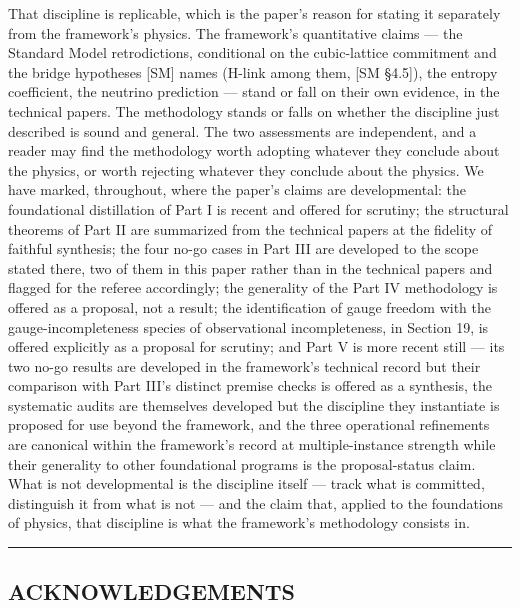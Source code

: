 \documentclass[
]{article}
\begin{document}
That discipline is replicable, which is the paper's reason for stating
it separately from the framework's physics. The framework's quantitative
claims --- the Standard Model retrodictions, conditional on the
cubic-lattice commitment and the bridge hypotheses {[}SM{]} names
(H-link among them, {[}SM §4.5{]}), the entropy coefficient, the
neutrino prediction --- stand or fall on their own evidence, in the
technical papers. The methodology stands or falls on whether the
discipline just described is sound and general. The two assessments are
independent, and a reader may find the methodology worth adopting
whatever they conclude about the physics, or worth rejecting whatever
they conclude about the physics. We have marked, throughout, where the
paper's claims are developmental: the foundational distillation of Part
I is recent and offered for scrutiny; the structural theorems of Part II
are summarized from the technical papers at the fidelity of faithful
synthesis; the four no-go cases in Part III are developed to the scope
stated there, two of them in this paper rather than in the technical
papers and flagged for the referee accordingly; the generality of the
Part IV methodology is offered as a proposal, not a result; the
identification of gauge freedom with the gauge-incompleteness species of
observational incompleteness, in Section 19, is offered explicitly as a
proposal for scrutiny; and Part V is more recent still --- its two no-go
results are developed in the framework's technical record but their
comparison with Part III's distinct premise checks is offered as a
synthesis, the systematic audits are themselves developed but the
discipline they instantiate is proposed for use beyond the framework,
and the three operational refinements are canonical within the
framework's record at multiple-instance strength while their generality
to other foundational programs is the proposal-status claim. What is not
developmental is the discipline itself --- track what is committed,
distinguish it from what is not --- and the claim that, applied to the
foundations of physics, that discipline is what the framework's
methodology consists in.

\begin{center}\rule{0.5\linewidth}{0.5pt}\end{center}

\hypertarget{acknowledgements}{%
\subsection{ACKNOWLEDGEMENTS}\label{acknowledgements}}
\end{document}

